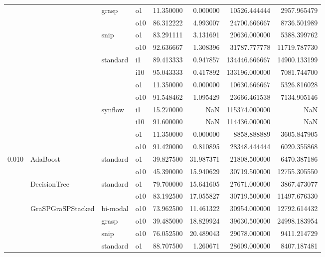 \begin{longtable}{llllrrrr}
      &     & grasp & o1 &  11.350000 &   0.000000 &     10526.444444 &   2957.965479 \\
      &     &         & o10 &  86.312222 &   4.993007 &     24700.666667 &   8736.501989 \\
      &     & snip & o1 &  83.291111 &   3.131691 &     20636.000000 &   5388.399762 \\
      &     &         & o10 &  92.636667 &   1.308396 &     31787.777778 &  11719.787730 \\
      &     & standard & i1 &  89.413333 &   0.947857 &    134446.666667 &  14900.133199 \\
      &     &         & i10 &  95.043333 &   0.417892 &    133196.000000 &   7081.744700 \\
      &     &         & o1 &  11.350000 &   0.000000 &     10630.666667 &   5326.816028 \\
      &     &         & o10 &  91.548462 &   1.095429 &     23666.461538 &   7134.905146 \\
      &     & synflow & i1 &  15.270000 &        NaN &    115374.000000 &           NaN \\
      &     &         & i10 &  91.600000 &        NaN &    114436.000000 &           NaN \\
      &     &         & o1 &  11.350000 &   0.000000 &      8858.888889 &   3605.847905 \\
      &     &         & o10 &  91.420000 &   0.810895 &     28348.444444 &   6020.355868 \\
0.010 & AdaBoost & standard & o1 &  39.827500 &  31.987371 &     21808.500000 &   6470.387186 \\
      &     &         & o10 &  45.390000 &  15.940629 &     30719.500000 &  12755.305550 \\
      & DecisionTree & standard & o1 &  79.700000 &  15.641605 &     27671.000000 &   3867.473077 \\
      &     &         & o10 &  83.192500 &  17.055827 &     30719.500000 &  11497.676330 \\
      & GraSPGraSPStacked & bi-modal & o10 &  73.962500 &  11.461322 &     30954.000000 &  12792.614432 \\
      &     & grasp & o10 &  39.485000 &  18.829924 &     39630.500000 &  24998.183954 \\
      &     & snip & o10 &  76.052500 &  20.489043 &     29078.000000 &   9411.214729 \\
      &     & standard & o1 &  88.707500 &   1.260671 &     28609.000000 &   8407.187481 \\

\end{longtable}
